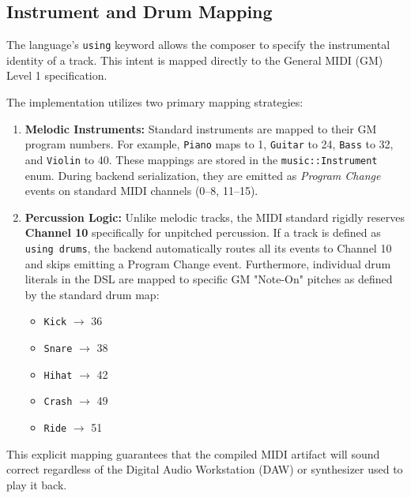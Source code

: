 \subsection{Instrument and Drum Mapping}

The language's \texttt{using} keyword allows the composer to specify the instrumental identity of a track.
This intent is mapped directly to the General MIDI (GM) Level 1 specification.

The implementation utilizes two primary mapping strategies:
\begin{enumerate}
    \item \textbf{Melodic Instruments:} Standard instruments are mapped to their GM program numbers. For example, \texttt{Piano} maps to 1, \texttt{Guitar} to 24, \texttt{Bass} to 32, and \texttt{Violin} to 40. These mappings are stored in the \texttt{music::Instrument} enum. During backend serialization, they are emitted as \textit{Program Change} events on standard MIDI channels (0--8, 11--15).
    \item \textbf{Percussion Logic:} Unlike melodic tracks, the MIDI standard rigidly reserves \textbf{Channel 10} specifically for unpitched percussion. If a track is defined as \texttt{using drums}, the backend automatically routes all its events to Channel 10 and skips emitting a Program Change event. Furthermore, individual drum literals in the DSL are mapped to specific GM "Note-On" pitches as defined by the standard drum map:
    \begin{itemize}
        \item \texttt{Kick} $\rightarrow$ 36
        \item \texttt{Snare} $\rightarrow$ 38
        \item \texttt{Hihat} $\rightarrow$ 42
        \item \texttt{Crash} $\rightarrow$ 49
        \item \texttt{Ride} $\rightarrow$ 51
    \end{itemize}
\end{enumerate}
This explicit mapping guarantees that the compiled MIDI artifact will sound correct regardless of the Digital Audio Workstation (DAW) or synthesizer used to play it back.
